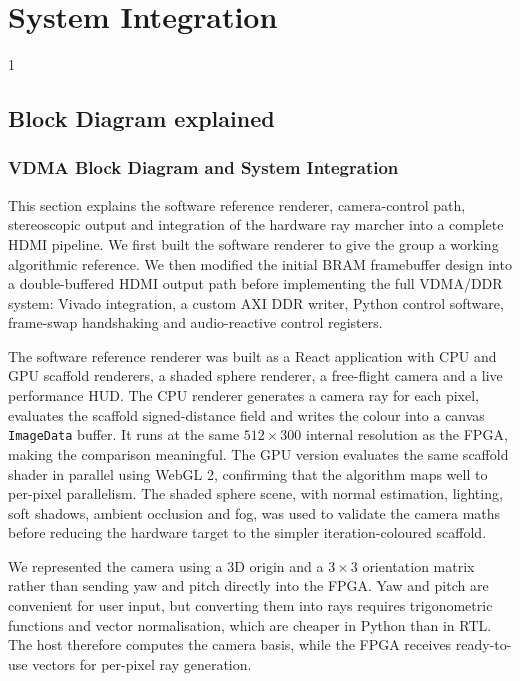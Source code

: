 \doublespacing

\chapter{System Integration}
\label{ch3}

\begin{spacing}{1}
\minitoc
\end{spacing}
\thesisspacing

\section{Block Diagram explained}

\subsection{VDMA Block Diagram and System Integration}

This section explains the software reference renderer, camera-control path, stereoscopic output and integration of the hardware ray marcher into a complete HDMI pipeline. We first built the software renderer to give the group a working algorithmic reference. We then modified the initial BRAM framebuffer design into a double-buffered HDMI output path before implementing the full VDMA/DDR system: Vivado integration, a custom AXI DDR writer, Python control software, frame-swap handshaking and audio-reactive control registers.

The software reference renderer was built as a React application with CPU and GPU scaffold renderers, a shaded sphere renderer, a free-flight camera and a live performance HUD. The CPU renderer generates a camera ray for each pixel, evaluates the scaffold signed-distance field and writes the colour into a canvas \texttt{ImageData} buffer. It runs at the same $512 \times 300$ internal resolution as the FPGA, making the comparison meaningful. The GPU version evaluates the same scaffold shader in parallel using WebGL 2, confirming that the algorithm maps well to per-pixel parallelism. The shaded sphere scene, with normal estimation, lighting, soft shadows, ambient occlusion and fog, was used to validate the camera maths before reducing the hardware target to the simpler iteration-coloured scaffold.

We represented the camera using a 3D origin and a $3 \times 3$ orientation matrix rather than sending yaw and pitch directly into the FPGA. Yaw and pitch are convenient for user input, but converting them into rays requires trigonometric functions and vector normalisation, which are cheaper in Python than in RTL. The host therefore computes the camera basis, while the FPGA receives ready-to-use vectors for per-pixel ray generation.

